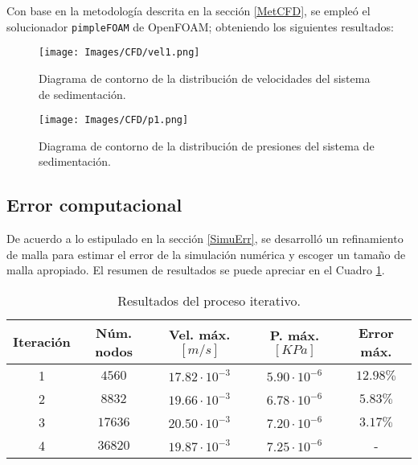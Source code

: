 \noindent
\justify

Con base en la metodolog\'ia descrita en la secci\'on \ref{MetCFD}, se emple\'o el solucionador \texttt{pimpleFOAM} de OpenFOAM; obteniendo los siguientes resultados:

\begin{figure}[h!]
	\centering
	\texttt{[image: Images/CFD/vel1.png]}
	\caption{Diagrama de contorno de la distribuci\'on de velocidades del sistema de sedimentaci\'on.}
	\label{CFD:vel}
\end{figure}

\begin{figure}[h!]
	\centering
	\texttt{[image: Images/CFD/p1.png]}
	\caption{Diagrama de contorno de la distribuci\'on de presiones del sistema de sedimentaci\'on.}
	\label{CFD:p}
\end{figure}

\subsection{Error computacional} \label{CompiError}

\noindent
\justify

De acuerdo a lo estipulado en la secci\'on \ref{SimuErr}, se desarroll\'o un refinamiento de malla para estimar el error de la simulaci\'on num\'erica y escoger un tama\~no de malla apropiado. El resumen de resultados se puede apreciar en el Cuadro \ref{resumErr}.

\begin{table}[h!]
	\centering
	\begin{tabular}{|c|c|c|c|c|}
		\hline
		\textbf{Iteraci\'on} & \textbf{N\'um. nodos} & \textbf{Vel. m\'ax.$[m/s]$} & \textbf{P. m\'ax. $[KPa]$} & \textbf{Error m\'ax.} \\ \hline
		1 & $4560$ & $17.82 \cdot 10 ^{-3}$ & $5.90 \cdot 10 ^{-6}$ & $12.98 \%$ \\ \hline
		2 & $8832$ & $19.66 \cdot 10 ^{-3}$ & $6.78 \cdot 10 ^{-6}$ & $5.83 \%$ \\ \hline
		3 & $17636$ & $20.50 \cdot 10 ^{-3}$ & $ 7.20 \cdot 10 ^{-6}$ & $3.17 \%$ \\ \hline
		4 & $36820$ & $19.87 \cdot 10 ^{-3}$ & $7.25 \cdot 10 ^{-6}$ & - \\ \hline
	\end{tabular}
	\caption{Resultados del proceso iterativo.}
	\label{resumErr}
\end{table}

\noindent
\justify

